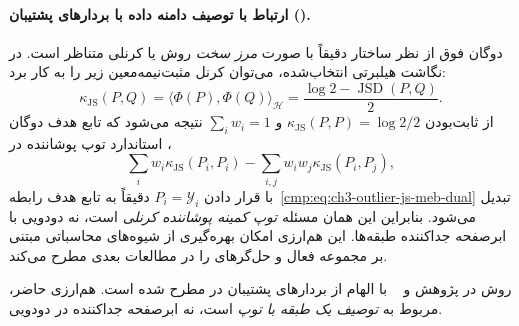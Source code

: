 \paragraph{ارتباط با توصیف دامنه داده با بردارهای پشتیبان ().}
دوگان فوق از نظر ساختار
دقیقاً با صورت \emph{مرز سخت}
روش 
یا  کرنلی متناظر است.
در نگاشت هیلبرتی انتخاب‌شده،
می‌توان کرنل مثبت‌نیمه‌معین
زیر را به کار برد:
\begin{equation}\label{cmp:eq:ch3-outlier-js-svdd-kernel}
\kappa_{\mathrm{JS}}(P,Q)
=\langle\Phi(P),\Phi(Q)\rangle_{\mathcal H}
=\frac{\log 2-\operatorname{JSD}(P,Q)}{2}.
\end{equation}
از ثابت‌بودن
$\kappa_{\mathrm{JS}}(P,P)=\log2/2$
و $\sum_iw_i=1$ نتیجه می‌شود که
تابع هدف دوگان استاندارد
توپ پوشاننده در ،
\[
\sum_iw_i\kappa_{\mathrm{JS}}(P_i,P_i)
-\sum_{i,j}w_iw_j\kappa_{\mathrm{JS}}(P_i,P_j),
\]
با قرار دادن $P_i=\mathscr Y_i$
دقیقاً به تابع هدف
رابطه~\eqref{cmp:eq:ch3-outlier-js-meb-dual}
تبدیل می‌شود.
بنابراین این همان مسئله
\emph{توپ کمینه پوشاننده کرنلی}
است، نه  دودویی
با ابرصفحه جداکننده طبقه‌ها.
این هم‌ارزی امکان بهره‌گیری
از شیوه‌های محاسباتی
مبتنی بر مجموعه فعال و
حل‌گرهای  را
در مطالعات بعدی مطرح می‌کند.

روش  در پژوهش
 و ~
\cite{TaxDuin2004SVDD}
با الهام از بردارهای پشتیبان
در  مطرح شده است.
هم‌ارزی حاضر، مربوط به
\emph{توصیف یک طبقه با توپ}
است، نه ابرصفحه جداکننده
در  دودویی.

